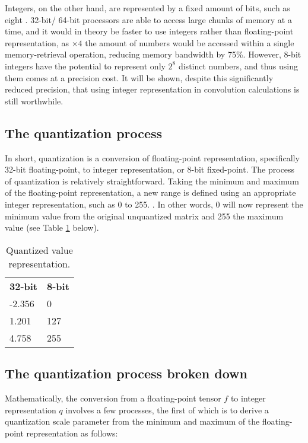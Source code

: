 Integers, on the other hand, are represented by a fixed amount of bits, such as eight \cite{ieee}. 32-bit/ 64-bit processors are able to access large chunks of memory at a time, and it would in theory be faster to use integers rather than floating-point representation, as $\times4$ the amount of numbers would be accessed within a single memory-retrieval operation, reducing memory bandwidth by 75\%. However, 8-bit integers have the potential to represent only $2^{8}$ distinct numbers, and thus using them comes at a precision cost. It will be shown, despite this significantly reduced precision, that using integer representation in convolution calculations is still worthwhile.

\subsection{The quantization process}
In short, quantization is a conversion of floating-point representation, specifically 32-bit floating-point, to integer representation, or 8-bit fixed-point. The process of quantization is relatively straightforward. Taking the minimum and maximum of the floating-point representation, a new range is defined using an appropriate integer representation, such as 0 to 255. \cite{warden_quantize}. In other words, 0 will now represent the minimum value from the original unquantized matrix and 255 the maximum value (see Table \ref{tbl:quantize} below).

\begin{table}[]
\centering
\caption[Quantized value representation]{Quantized value representation.}
\label{tbl:quantize}
\begin{tabular}{ll}
\textbf{32-bit} & \textbf{8-bit} \\
-2.356          & 0              \\
1.201           & 127            \\
4.758           & 255           
\end{tabular}
\end{table}

\subsection{The quantization process broken down}
\label{sec:quantization}
Mathematically, the conversion from a floating-point tensor $f$ to integer representation $q$ involves a few processes, the first of which is to derive a quantization scale parameter from the minimum and maximum of the floating-point representation as follows:

